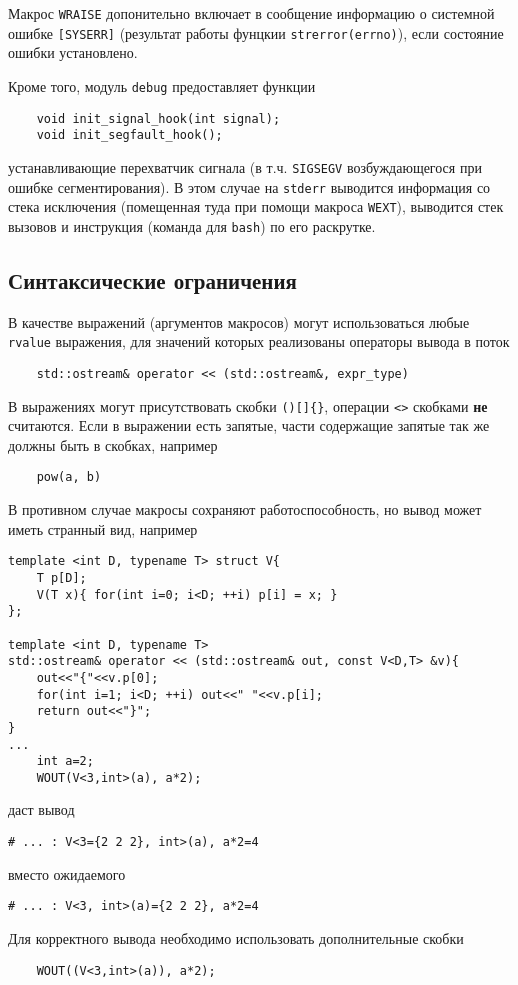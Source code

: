Макрос \verb'WRAISE' допонительно включает в сообщение информацию о системной ошибке \verb'[SYSERR]' (результат работы
фунцкии \verb'strerror(errno)'), если состояние ошибки установлено.

Кроме того, модуль \verb'debug' предоставляет функции
\begin{verbatim}
    void init_signal_hook(int signal);
    void init_segfault_hook();
\end{verbatim}
устанавливающие перехватчик сигнала (в т.ч. \verb'SIGSEGV'
возбуждающегося при ошибке сегментирования).
В этом случае на \verb'stderr' выводится информация со стека исключения
(помещенная туда при помощи макроса \verb'WEXT'), выводится стек вызовов и инструкция (команда для \verb'bash') по его раскрутке. 

\subsection{Синтаксические ограничения}
В качестве выражений (аргументов макросов) могут использоваться любые \verb'rvalue' выражения,
для значений которых реализованы операторы
вывода в поток
\begin{verbatim}
    std::ostream& operator << (std::ostream&, expr_type)
\end{verbatim}

В выражениях могут присутствовать скобки \verb'()[]{}', операции \verb'<>' скобками {\bf не} считаются.
Если в выражении есть запятые, части содержащие запятые так же должны быть в скобках, например
\begin{verbatim}
    pow(a, b)   
\end{verbatim}
В противном случае макросы сохраняют работоспособность, но вывод может иметь странный вид, например
\begin{verbatim}
template <int D, typename T> struct V{
    T p[D];
    V(T x){ for(int i=0; i<D; ++i) p[i] = x; }
};

template <int D, typename T> 
std::ostream& operator << (std::ostream& out, const V<D,T> &v){
    out<<"{"<<v.p[0];
    for(int i=1; i<D; ++i) out<<" "<<v.p[i];
    return out<<"}";
}
...
    int a=2;
    WOUT(V<3,int>(a), a*2);
\end{verbatim}
даст вывод
\begin{verbatim}
# ... : V<3={2 2 2}, int>(a), a*2=4
\end{verbatim}
вместо ожидаемого
\begin{verbatim}
# ... : V<3, int>(a)={2 2 2}, a*2=4
\end{verbatim}
Для корректного вывода необходимо использовать дополнительные скобки
\begin{verbatim}
    WOUT((V<3,int>(a)), a*2);
\end{verbatim}

